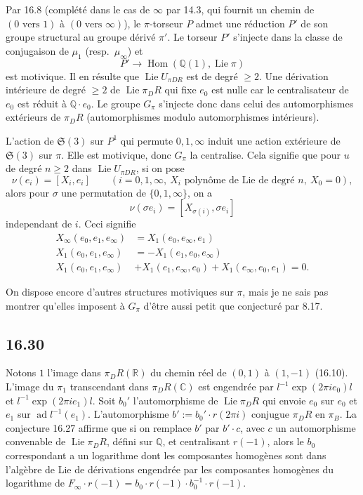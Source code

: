 \documentclass[12pt,a4paper]{article}
\theoremstyle{plain}
\theoremstyle{definition}
\theoremstyle{remark}
\DeclareMathOperator{\Lie}{Lie}
\DeclareMathOperator{\ad}{ad}
\DeclareMathOperator{\Hom}{Hom}
\newcommand{\Betti}{B}
\newcommand{\dR}{DR}
\newcommand{\QQ}{\mathbb{Q}}
\newcommand{\CC}{\mathbb{C}}
\newcommand{\RR}{\mathbb{R}}
\begin{document}
Par 16.8 (compl\'et\'e dans le cas de $\infty$ par 14.3, qui fournit un
chemin de $(0 \text{ vers } 1)$ \`a $(0 \text{ vers } \infty)$), le
$\pi$-torseur $P$ admet une r\'eduction $P'$ de son groupe structural au
groupe d\'eriv\'e $\pi'$. Le torseur $P'$ s'injecte dans la classe de
conjugaison de $\mu_1$ (resp.\ $\mu_\infty$) et
\[
P' \to \Hom(\QQ(1), \Lie \pi)
\]
est motivique. Il en r\'esulte que $\Lie U_{\pi\dR}$ est de degr\'e
$\geq 2$. Une d\'erivation int\'erieure de degr\'e $\geq 2$ de
$\Lie \pi_\dR$ qui fixe $e_0$ est nulle car le centralisateur de $e_0$
est r\'eduit \`a $\QQ \cdot e_0$. Le groupe $G_\pi$ s'injecte donc dans
celui des automorphismes ext\'erieurs de $\pi_\dR$ (automorphismes modulo
automorphismes int\'erieurs).

L'action de $\mathfrak{S}(3)$ sur $P^1$ qui permute $0,1,\infty$ induit
une action ext\'erieure de $\mathfrak{S}(3)$ sur $\pi$. Elle est
motivique, donc $G_\pi$ la centralise. Cela signifie que pour $u$ de
degr\'e $n \geq 2$ dans $\Lie U_{\pi\dR}$, si on pose
\begin{equation}\label{eq:16.29.1}
\nu(e_i) = [X_i, e_i] \qquad (i=0,1,\infty,\ X_i \text{ polyn\^ome de
Lie de degr\'e } n,\ X_0 = 0),
\end{equation}
alors pour $\sigma$ une permutation de $\{0,1,\infty\}$, on a
\[
\nu(\sigma e_i) = [X_{\sigma(i)}, \sigma e_i]
\]
independant de $i$. Ceci signifie
\begin{align*}
X_\infty(e_0,e_1,e_\infty) &= X_1(e_0,e_\infty,e_1) \\
X_1(e_0,e_1,e_\infty) &= -X_1(e_1,e_0,e_\infty) \\
X_1(e_0,e_1,e_\infty) &+ X_1(e_1,e_\infty,e_0) +
X_1(e_\infty,e_0,e_1) = 0.
\end{align*}

On dispose encore d'autres structures motiviques sur $\pi$, mais je ne
sais pas montrer qu'elles imposent \`a $G_\pi$ d'\^etre aussi petit que
conjectur\'e par 8.17.

\subsection*{16.30}

Notons $1$ l'image dans $\pi_\dR(\RR)$ du chemin r\'eel de $(0,1)$ \`a
$(1,-1)$ (16.10). L'image du $\pi_1$ transcendant dans $\pi_\dR(\CC)$
est engendr\'ee par $l^{-1}\exp(2\pi i e_0)l$ et
$l^{-1}\exp(2\pi i e_1)l$. Soit $b_0'$ l'automorphisme de $\Lie \pi_\dR$
qui envoie $e_0$ sur $e_0$ et $e_1$ sur $\ad l^{-1}(e_1)$.
L'automorphisme $b' := b_0' \cdot r(2\pi i)$ conjugue $\pi_\dR$ en
$\pi_\Betti$. La conjecture 16.27 affirme que si on remplace $b'$ par
$b' \cdot c$, avec $c$ un automorphisme convenable de $\Lie \pi_\dR$,
d\'efini sur $\QQ$, et centralisant $r(-1)$, alors le $b_0$ correspondant
a un logarithme dont les composantes homog\`enes sont dans l'alg\`ebre
de Lie de d\'erivations engendr\'ee par les composantes homog\`enes du
logarithme de $F_\infty \cdot r(-1) = b_0 \cdot r(-1) \cdot b_0^{-1} \cdot
r(-1)$.
\end{document}
